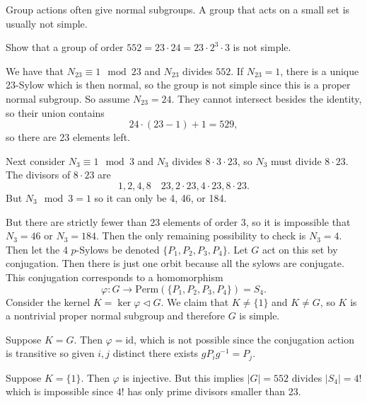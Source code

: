Group actions often give normal subgroups. A group that acts on a
small set is usually not simple.

\begin{xmpl}
  Show that a group of order
  $552 = 23 \cdot 24 = 23 \cdot 2^3 \cdot 3$ is not simple.
\end{xmpl}
We have that $N_{23} \equiv 1 \mod 23$ and $N_{23}$ divides $552$.
If $N_{23} = 1$, there is a unique 23-Sylow which is then normal,
so the group is not simple since this is a proper normal subgroup.
So assume $N_{23} = 24$. They cannot intersect besides the identity,
so their union contains
$$
24 \cdot (23 - 1) + 1 = 529,
$$
so there are 23 elements left.

Next consider $N_3 \equiv 1 \mod 3$ and $N_3$ divides
$8 \cdot 3 \cdot 23$, so $N_3$ must divide $8 \cdot 23$. The divisors
of $8 \cdot 23$ are
$$
1, 2, 4, 8 \quad 23, 2 \cdot 23, 4 \cdot 23, 8 \cdot 23.
$$
But $N_3 \mod 3 = 1$ so it can only be 4, 46, or 184.

But there are strictly fewer than 23 elements of order 3, so it is impossible
that $N_3 = 46$ or $N_3 = 184$. Then the only remaining possibility to
check is $N_3 = 4$. Then let the 4 $p$-Sylows be denoted
$\{ P_1, P_2, P_3, P_4 \}$. Let $G$ act on this set by
conjugation. Then there is just one orbit because all the sylows are
conjugate. This conjugation corresponds to a homomorphism
$$
\varphi : G \to \mathrm{Perm}(\{P_1, P_2, P_3, P_4\}) = S_4.
$$
Consider the kernel $K = \ker \varphi \triangleleft G$.
We claim that $K \neq \{ 1 \}$ and $K \neq G$, so $K$ is a
nontrivial proper normal subgroup and therefore $G$ is simple.

Suppose $K = G$. Then $\varphi = \mathrm{id}$, which is not possible
since the conjugation action is transitive so given $i, j$ distinct
there exists $g P_i g^{-1} = P_j$.

Suppose $K = \{ 1 \}$. Then $\varphi$ is injective. But this implies
$|G| = 552$ divides $|S_4| = 4!$ which is impossible since $4!$ has
only prime divisors smaller than 23.

